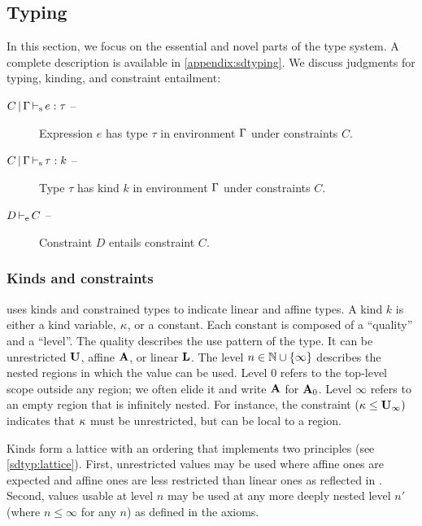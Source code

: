
\subsection{Typing}
\label{sdtyping}

In this section, we focus on the essential and novel parts of the type system. A complete
description is available in \cref{appendix:sdtyping}.
%
We discuss judgments for typing, kinding, and constraint entailment:
\begin{description}
\item[$C \operatorname{|} \Gamma \operatorname{\vdash_s} e : \tau$ --]
  Expression $e$ has type $\tau$ in environment $\Gamma$ under constraints $C$.
\item[$C \operatorname{|} \Gamma \operatorname{\vdash_s} \tau : k$ --]
  Type $\tau$ has kind $k$ in environment $\Gamma$ under constraints $C$.
\item[$D \operatorname{\vdash_e} C$ --] Constraint $D$ entails constraint $C$.
\end{description}

\subsubsection{Kinds and constraints}

\affe uses kinds and constrained types to indicate
linear and affine types.
A kind $k$ is either a kind variable, $\kappa$, or a constant.
Each constant is composed of a ``quality'' and a ``level''.
The quality describes the use pattern of the type. It can be
unrestricted $\mathbf{U}$, affine $\mathbf{A}$, or linear $\mathbf{L}$. The level  $n \in \mathbb{N} \cup \{\infty\}$
describes the nested regions in which the value can be used.
Level $0$ refers to the top-level scope outside any region; we often elide it
and write $\mathbf{A}$ for $\mathbf{A}_0$. Level
$\infty$ refers to an empty region that is infinitely nested.
For instance, the constraint $(\kappa \leq \mathbf{U}_\infty)$ indicates that
$\kappa$ must be unrestricted, but can be local to a region.

Kinds form a lattice with an ordering that implements two principles
(see \cref{sdtyp:lattice}). First, unrestricted values may be used
where affine ones are expected and affine ones are less restricted
than linear ones as reflected in .
Second, values usable at level $n$ may be used at any more deeply
nested level $n'$ (where $n\le\infty$ for any $n$) as defined in the  axioms.

